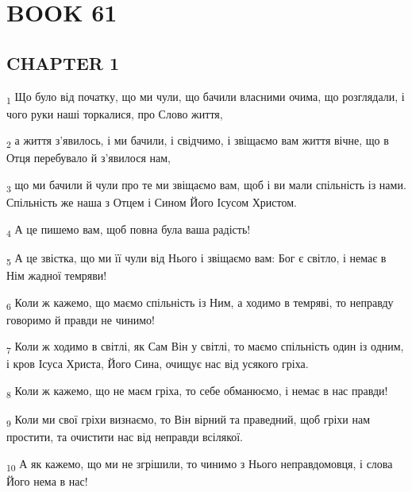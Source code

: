 \section{BOOK 61}
\subsection{CHAPTER 1}
\begin{tcolorbox}
\textsubscript{1} Що було від початку, що ми чули, що бачили власними очима, що розглядали, і чого руки наші торкалися, про Слово життя,
\end{tcolorbox}
\begin{tcolorbox}
\textsubscript{2} а життя з'явилось, і ми бачили, і свідчимо, і звіщаємо вам життя вічне, що в Отця перебувало й з'явилося нам,
\end{tcolorbox}
\begin{tcolorbox}
\textsubscript{3} що ми бачили й чули про те ми звіщаємо вам, щоб і ви мали спільність із нами. Спільність же наша з Отцем і Сином Його Ісусом Христом.
\end{tcolorbox}
\begin{tcolorbox}
\textsubscript{4} А це пишемо вам, щоб повна була ваша радість!
\end{tcolorbox}
\begin{tcolorbox}
\textsubscript{5} А це звістка, що ми її чули від Нього і звіщаємо вам: Бог є світло, і немає в Нім жадної темряви!
\end{tcolorbox}
\begin{tcolorbox}
\textsubscript{6} Коли ж кажемо, що маємо спільність із Ним, а ходимо в темряві, то неправду говоримо й правди не чинимо!
\end{tcolorbox}
\begin{tcolorbox}
\textsubscript{7} Коли ж ходимо в світлі, як Сам Він у світлі, то маємо спільність один із одним, і кров Ісуса Христа, Його Сина, очищує нас від усякого гріха.
\end{tcolorbox}
\begin{tcolorbox}
\textsubscript{8} Коли ж кажемо, що не маєм гріха, то себе обманюємо, і немає в нас правди!
\end{tcolorbox}
\begin{tcolorbox}
\textsubscript{9} Коли ми свої гріхи визнаємо, то Він вірний та праведний, щоб гріхи нам простити, та очистити нас від неправди всілякої.
\end{tcolorbox}
\begin{tcolorbox}
\textsubscript{10} А як кажемо, що ми не згрішили, то чинимо з Нього неправдомовця, і слова Його нема в нас!
\end{tcolorbox}
